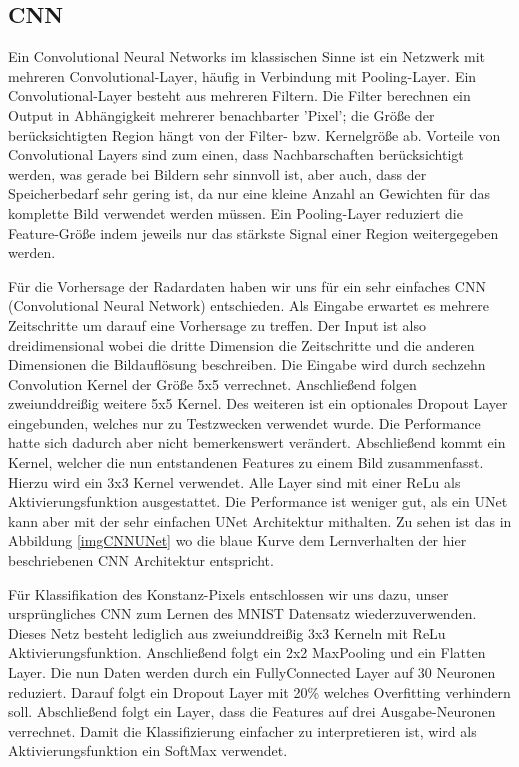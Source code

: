 \subsection{CNN}
\label{kapitelCNN}
Ein Convolutional Neural Networks im klassischen Sinne ist ein Netzwerk mit mehreren Convolutional-Layer, häufig in Verbindung mit Pooling-Layer. Ein Convolutional-Layer besteht aus mehreren Filtern. Die Filter berechnen ein Output in Abhängigkeit mehrerer benachbarter 'Pixel'; die Größe der berücksichtigten Region hängt von der Filter- bzw. Kernelgröße ab.
Vorteile von Convolutional Layers sind zum einen, dass Nachbarschaften berücksichtigt werden, was gerade bei Bildern sehr sinnvoll ist, aber auch, dass der Speicherbedarf sehr gering ist, da nur eine kleine Anzahl an Gewichten für das komplette Bild verwendet werden müssen.
Ein Pooling-Layer reduziert die Feature-Größe indem jeweils nur das stärkste Signal einer Region weitergegeben werden.

Für die Vorhersage der Radardaten haben wir uns für ein sehr einfaches CNN (Convolutional Neural Network) entschieden.
Als Eingabe erwartet es mehrere Zeitschritte um darauf eine Vorhersage zu treffen. Der Input ist also dreidimensional wobei die dritte Dimension die Zeitschritte und die anderen Dimensionen die Bildauflösung beschreiben. Die Eingabe wird durch sechzehn Convolution Kernel der Größe 5x5 verrechnet. Anschließend folgen zweiunddreißig weitere 5x5 Kernel. Des weiteren ist ein optionales Dropout Layer eingebunden, welches nur zu Testzwecken verwendet wurde. Die Performance hatte sich dadurch aber nicht bemerkenswert verändert. Abschließend kommt ein Kernel, welcher die nun entstandenen Features zu einem Bild zusammenfasst. Hierzu wird ein 3x3 Kernel verwendet. Alle Layer sind mit einer ReLu als Aktivierungsfunktion ausgestattet.
Die Performance ist weniger gut, als ein UNet kann aber mit der sehr einfachen UNet Architektur mithalten. Zu sehen ist das in Abbildung \ref{imgCNNUNet} wo die blaue Kurve dem Lernverhalten der hier beschriebenen CNN Architektur entspricht.

Für Klassifikation des Konstanz-Pixels entschlossen wir uns dazu, unser ursprüngliches CNN zum Lernen des MNIST Datensatz wiederzuverwenden. Dieses Netz besteht lediglich aus zweiunddreißig 3x3 Kerneln mit ReLu Aktivierungsfunktion. Anschließend folgt ein 2x2 MaxPooling und ein Flatten Layer. Die nun  Daten werden durch ein FullyConnected Layer auf 30 Neuronen reduziert. Darauf folgt ein Dropout Layer mit 20\% welches Overfitting verhindern soll. Abschließend folgt ein Layer, dass die Features auf drei Ausgabe-Neuronen verrechnet. Damit die Klassifizierung einfacher zu interpretieren ist, wird als Aktivierungsfunktion ein SoftMax verwendet.

